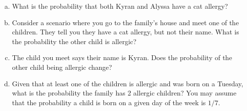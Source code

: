 \documentclass[12pt,letterpaper]{article}
\newenvironment{22enumerate}{\begin{enumerate}[a.]\itemsep0em}{\end{enumerate}}
\begin{document}
\begin{22enumerate}
\item What is the probability that both Kyran and Alyssa have a cat allergy?
\item Consider a scenario where you go to the family's house and meet one of the children. They tell you they have a cat allergy, but not their name. What is the probability the other child is allergic?
\item The child you meet says their name is Kyran. Does the probability of the other child being allergic change?
\item Given that at least one of the children is allergic and was born on a Tuesday, what is the probability the family has 2 allergic children? You may assume that the probability a child is born on a given day of the week is $1/7$. 
\end{22enumerate}
\end{document}
